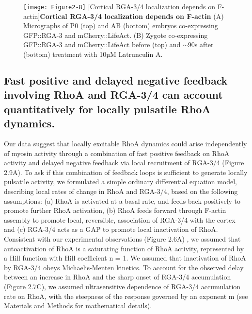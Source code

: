 \documentclass{ucetd}
\begin{document}
\begin{figure}[!htbp]
\centering
\texttt{[image: Figure2-8]}
[Cortical RGA-3/4 localization depends on F-actin]{\textbf{Cortical RGA-3/4 localization depends on F-actin} (A) Micrographs of P0 (top) and AB (bottom) embryos co-expressing GFP::RGA-3 and mCherry::LifeAct. (B) Zygote co-expressing GFP::RGA-3 and mCherry::LifeAct before (top) and $\sim$90s after (bottom) treatment with 10µM Latrunculin A.}
\end{figure}



\subsection{Fast positive and delayed negative feedback involving RhoA and RGA-3/4 can account quantitatively for locally pulsatile RhoA dynamics.}
Our data suggest that locally excitable RhoA dynamics could arise independently of myosin activity through a combination of fast positive feedback on RhoA activity and delayed negative feedback via local recruitment of RGA-3/4 (Figure 2.9A).  To ask if this combination of feedback loops is sufficient to generate locally pulsatile activity, we formulated a simple ordinary differential equation model, describing local rates of change in RhoA and RGA-3/4, based on the following assumptions:  (a)  RhoA is activated at a basal rate, and feeds back positively to promote further RhoA activation, (b) RhoA feeds forward through F-actin assembly to promote local, reversible, association of RGA-3/4 with the cortex and (c) RGA-3/4 acts as a GAP to promote local inactivation of RhoA. Consistent with our experimental observations (Figure 2.6A) , we assumed that autoactivation of RhoA is a saturating function of RhoA activity, represented by a Hill function with Hill coefficient n = 1. We assumed that inactivation of RhoA by RGA-3/4 obeys Michaelis-Menten kinetics. To account for the observed delay between an increase in RhoA and the sharp onset of RGA-3/4 accumulation (Figure 2.7C), we assumed ultrasensitive dependence of RGA-3/4 accumulation rate on RhoA, with the steepness of the response governed by an exponent m (see Materials and Methods for mathematical details). 
\end{document}
